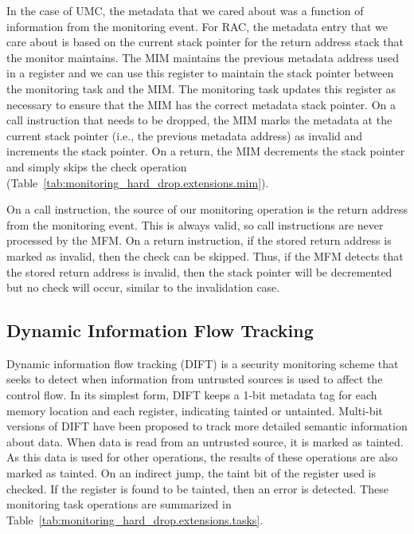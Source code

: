 In the case of UMC, the metadata that we cared about was a function of
information from the monitoring event. For RAC, the metadata entry that we care
about is based on the current stack pointer for the return address stack that
the monitor maintains.  The MIM maintains the previous metadata address used in
a register and we can use this register to maintain the stack pointer between
the monitoring task and the MIM. The monitoring task updates this register as
necessary to ensure that the MIM has the correct metadata stack pointer. On a
call instruction that needs to be dropped, the MIM marks the metadata at the
current stack pointer (i.e., the previous metadata address) as invalid and
increments the stack pointer. On a return, the MIM decrements the stack pointer
and simply skips the check operation
(Table~\ref{tab:monitoring_hard_drop.extensions.mim}).

On a call instruction, the source of our monitoring operation is the return
address from the monitoring event. This is always valid, so call instructions
are never processed by the MFM. On a return instruction, if the stored return
address is marked as invalid, then the check can be skipped. Thus, if the MFM
detects that the stored return address is invalid, then the stack pointer will
be decremented but no check will occur, similar to the invalidation case.

\subsection{Dynamic Information Flow Tracking}
\label{sec:monitoring_hard_drop.extensions.dift}

Dynamic information flow tracking (DIFT) \cite{dift-asplos04} is a security
monitoring scheme that seeks to detect when information from untrusted sources
is used to affect the control flow.  In its simplest form, DIFT keeps a 1-bit
metadata tag for each memory location and each register, indicating tainted or
untainted. Multi-bit versions of DIFT have been proposed to track more detailed
semantic information about data. When data is read from an untrusted source, it
is marked as tainted. As this data is used for other operations, the results of
these operations are also marked as tainted. On an indirect jump, the taint bit
of the register used is checked. If the register is found to be tainted, then
an error is detected. These monitoring task operations are summarized in
Table~\ref{tab:monitoring_hard_drop.extensions.tasks}.

